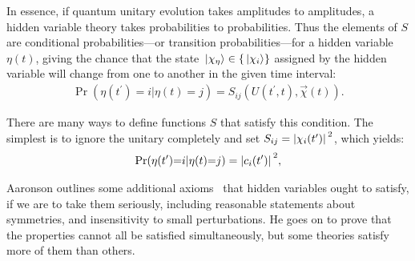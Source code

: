 In essence, if quantum unitary evolution takes amplitudes to amplitudes, a hidden variable theory takes probabilities to probabilities. Thus the elements of $S$ are conditional probabilities---or transition probabilities---for a hidden variable $\eta(t)$, giving the chance that the state $\ket{\chi_\eta} \in \{\ket{\chi_i}\}$ assigned by the hidden variable will change from one to another in the given time interval:
\begin{align}\label{eq:conditional_probability}
\Pr(\eta(t^\prime){=}i|\eta(t){=}j) = S_{ij}(U(t^\prime, t), \vec\chi(t)).
\end{align}

There are many ways to define functions $S$ that satisfy this condition. The simplest is to ignore the unitary completely and set $S_{ij} = \abs{\chi_i(t^\prime)}^2$, which yields:
\begin{align}
\Pr(\eta(t^\prime){=}i|\eta(t){=}j) = \abs{c_{i}(t^\prime)}^2,
\end{align}

Aaronson outlines some additional axioms~\cite{PhysRevA.71.032325} that hidden variables ought to satisfy, if we are to take them seriously, including reasonable statements about symmetries, and insensitivity to small perturbations. He goes on to prove that the properties cannot all be satisfied simultaneously, but some theories satisfy more of them than others.

